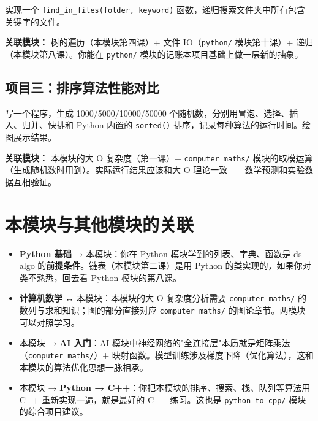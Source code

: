 \documentclass[a4paper,12pt]{ctexart}
\begin{document}
实现一个 \texttt{find\_in\_files(folder, keyword)} 函数，递归搜索文件夹中所有包含关键字的文件。

\textbf{关联模块：} 树的遍历（本模块第四课）+ 文件 IO（\texttt{python/} 模块第十课）+ 递归（本模块第八课）。你能在 \texttt{python/} 模块的记账本项目基础上做一层新的抽象。

\subsection*{项目三：排序算法性能对比}

写一个程序，生成 1000/5000/10000/50000 个随机数，分别用冒泡、选择、插入、归并、快排和 Python 内置的 \texttt{sorted()} 排序，记录每种算法的运行时间。绘图展示结果。

\textbf{关联模块：} 本模块的大 O 复杂度（第一课）+ \texttt{computer\_maths/} 模块的取模运算（生成随机数时用到）。实际运行结果应该和大 O 理论一致——数学预测和实验数据互相验证。

\section*{本模块与其他模块的关联}

\begin{itemize}
  \item \textbf{Python 基础} → 本模块：你在 Python 模块学到的列表、字典、函数是 ds-algo 的\textbf{前提条件}。链表（本模块第二课）是用 Python 的类实现的，如果你对类不熟悉，回去看 Python 模块的第八课。
  \item \textbf{计算机数学} ↔ 本模块：本模块的大 O 复杂度分析需要 \texttt{computer\_maths/} 的数列与求和知识；图的部分直接对应 \texttt{computer\_maths/} 的图论章节。两模块可以对照学习。
  \item 本模块 → \textbf{AI 入门}：AI 模块中神经网络的"全连接层"本质就是矩阵乘法（\texttt{computer\_maths/}）+ 映射函数。模型训练涉及梯度下降（优化算法），这和本模块的算法优化思想一脉相承。
  \item 本模块 → \textbf{Python → C++}：你把本模块的排序、搜索、栈、队列等算法用 C++ 重新实现一遍，就是最好的 C++ 练习。这也是 \texttt{python-to-cpp/} 模块的综合项目建议。
\end{itemize}
\end{document}
